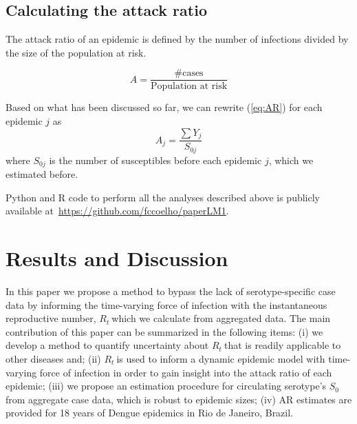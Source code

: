 \documentclass[10pt]{article}
\def \rr {$R_{t}\:$}
\begin{document}
\subsection*{Calculating the attack ratio}

The attack ratio of an epidemic is defined by the number of infections divided 
by the size of the population at risk.

\begin{equation}
\label{eq:AR}
A=\frac{\text{\# cases}}{\text{Population at risk}} 
\end{equation}

Based on what has been discussed so far, we can rewrite (\ref{eq:AR}) for 
each epidemic $j$ as
\begin{equation}
\label{eq:AR2}
 A_{j}=\frac{\sum Y_j}{S_{0j}}
\end{equation}
where $S_{0j}$ is the number of susceptibles before each epidemic $j$, which we
estimated before.

Python and R code to perform all the analyses described above is publicly 
available at~\url{https://github.com/fccoelho/paperLM1}.

\section*{Results and Discussion}

In this paper we propose a method to bypass the lack of serotype-specific case 
data by informing the time-varying force of infection with the instantaneous 
reproductive number, \rr which we calculate from aggregated data.
The main contribution of this paper can be summarized in the following items: 
(i) we develop a method to quantify uncertainty 
about \rr that is readily applicable to other diseases and; (ii) \rr is used to 
inform a dynamic epidemic model with time-varying force of infection 
in order to gain insight into the attack ratio of each epidemic; (iii) we 
propose an estimation procedure for circulating serotype's $S_0$ from 
aggregate case data, which is robust to epidemic sizes; (iv) AR estimates are 
provided for 18 years of Dengue epidemics in Rio de Janeiro, Brazil. 
\end{document}
